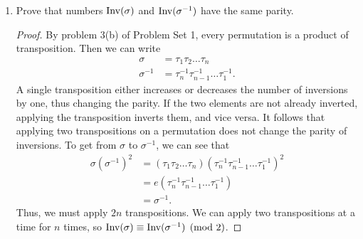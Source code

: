 \documentclass{article}
\begin{document}
\begin{enumerate}[label=(\alph*)]
\begin{proof}
\begin{align*}
    \end{align*}
    \par Consider a permutation $\pi \in \mathbb{S}_n$. Then we can insert the $n+1$ element in the $i^{\textup{th}}$ position for $1\leq i\leq n+1$ and increase the indices of the elements to the right of $n+1$ by one. Call the new permutation $\pi'$. Since the $n+1$ element is now the largest in the set, inserting it in the $i^{\textup{th}}$ position adds $n+1-i$ inversions. Thus,
    \begin{align*}
        x^{\textup{Inv}(\pi')}
        &=x^{\textup{Inv}(\pi)}+x^{\textup{Inv}(\pi)+1}+x^{\textup{Inv}(\pi)+2}+\dots+x^{\textup{Inv}(\pi)+n}\\
        &=x^{\textup{Inv}(\pi)}(1+x+x^2+\dots+x^{n})
    \end{align*}
    Considering the summation of every $\pi \in \mathbb{S}_n$, we have 
    \[ \sum_{\pi' \in \mathbb{S}_{n+1}} x^{\textup{Inv}(\pi')}=\sum_{\pi \in \mathbb{S}_n} x^{\textup{Inv}(\pi)}(1+x+x^2+\dots+x^{n})\]
    as desired.
    \end{proof}
    \item Prove that numbers $\textup{Inv}(\sigma)$ and $\textup{Inv}(\sigma^{-1})$ have the same parity.
    \begin{proof}
    By problem 3(b) of Problem Set 1, every permutation is a product of transposition. Then we can write 
    \begin{align*}
        \sigma &= \tau_1\tau_2\dots\tau_n\\
        \sigma^{-1} &= \tau_n^{-1}\tau_{n-1}^{-1}\dots\tau_1^{-1}.
    \end{align*}
    A single transposition either increases or decreases the number of inversions by one, thus changing the parity. If the two elements are not already inverted, applying the transposition inverts them, and vice versa. It follows that applying two transpositions on a permutation does not change the parity of inversions. To get from $\sigma$ to $\sigma^{-1}$, we can see that 
    \begin{align*}
        \sigma(\sigma^{-1})^2 &= (\tau_1\tau_2\dots\tau_n)(\tau_n^{-1}\tau_{n-1}^{-1}\dots\tau_1^{-1})^2\\
        &=e(\tau_n^{-1}\tau_{n-1}^{-1}\dots\tau_1^{-1})\\&=\sigma^{-1}.
    \end{align*}
    Thus, we must apply $2n$ transpositions. We can apply two transpositions at a time for $n$ times, so $\textup{Inv}(\sigma)\equiv \textup{Inv}(\sigma^{-1})\pmod{2}$.
    \end{proof}
\end{enumerate}
\end{document}
